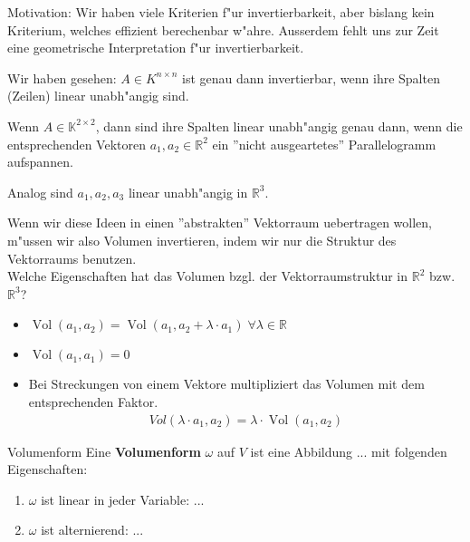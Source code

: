 \documentclass[oneside,fontsize=11pt,paper=a4,BCOR=0mm,DIV=12,automark,headsepline]{scrbook}
\DeclareMathOperator{\mVol}{Vol}
\theoremstyle{remark}
\theoremstyle{definition}
\theoremstyle{definition}
\theoremstyle{remark}
\begin{document}
Motivation: Wir haben viele Kriterien f"ur invertierbarkeit, aber bislang kein
Kriterium, welches effizient berechenbar w"ahre. Ausserdem fehlt uns zur Zeit
eine geometrische Interpretation f"ur invertierbarkeit.

\begin{relation}
  \begin{trivlist}
  \item Wir haben gesehen: $A\in K^{n\times n}$ ist genau dann invertierbar, wenn ihre Spalten
    (Zeilen) linear unabh"angig sind.
    
  \item  Wenn $A\in \mathbb{K}^{2\times 2}$, dann sind ihre
    Spalten linear unabh"angig genau dann, wenn die entsprechenden Vektoren $a_1,
    a_2 \in \mathbb{R}^2$ ein ''nicht ausgeartetes'' Parallelogramm aufspannen. \\

  \item Analog sind $a_1, a_2, a_3$ linear unabh"angig in $\mathbb{R}^3$.
  \end{trivlist}
\end{relation}

Wenn wir diese Ideen in einen ''abstrakten'' Vektorraum uebertragen wollen,
m"ussen wir also Volumen invertieren, indem wir nur die Struktur des
Vektorraums benutzen.\\

Welche Eigenschaften hat das Volumen bzgl. der Vektorraumstruktur in
$\mathbb{R}^2$ bzw. $\mathbb{R}^3$?
\begin{itemize}
\item $\mVol(a_1,a_2)=\mVol(a_1, a_2 + \lambda \cdot a_1)\; \forall \lambda \in
  \mathbb{R}$
\item $\mVol(a_1,a_1)=0$
\item Bei Streckungen von einem Vektore multipliziert das Volumen mit dem
  entsprechenden Faktor.
  \begin{align*}
    Vol(\lambda\cdot a_1, a_2)=\lambda\cdot \mVol(a_1,a_2) \tag{$\lambda \geq 0$}
  \end{align*}
\end{itemize}

\begin{definition}{Volumenform}
  Eine \textbf{Volumenform} $\omega$ auf $V$ ist eine Abbildung ... mit
  folgenden Eigenschaften:
  \begin{enumerate}
  \item $\omega$ ist linear in jeder Variable: ...
  \item $\omega$ ist alternierend: ...
  \end{enumerate}
\end{definition}
\end{document}
